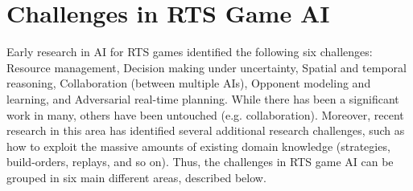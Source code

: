 \documentclass{llncs}
\begin{document}




\section{Challenges in RTS Game AI}\label{subsec:challenges}

Early research  in AI  for RTS  games \cite{Buro03rts}  identified the
following six challenges: Resource management, Decision making under uncertainty, Spatial and temporal reasoning, Collaboration (between multiple AIs), Opponent modeling and learning, and Adversarial real-time planning. While there  has been  a significant  work in  many, others  have been
untouched (e.g. collaboration). Moreover, recent research in this area
has identified several additional research  challenges, such as how to
exploit the massive amounts  of existing domain knowledge (strategies,
build-orders,  replays,  and  so   on). Thus, the challenges in RTS game AI can be grouped in six main different areas, described below.
\end{document}
